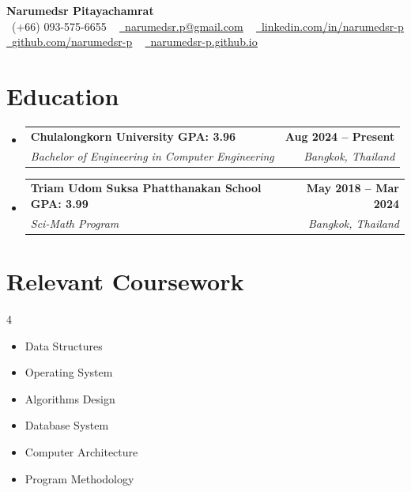 \documentclass[letterpaper,11pt]{article}
\makeatletter
\newcommand{\resumeSubheading}[4]{
  \vspace{-2pt}\item
    \begin{tabular*}{1.0\textwidth}[t]{l@{\extracolsep{\fill}}r}
      \textbf{#1} & \textbf{\small #2} \\
      \textit{\small#3} & \textit{\small #4} \\
    \end{tabular*}\vspace{-7pt}
}
\newcommand{\resumeSubHeadingListStart}{\begin{itemize}[leftmargin=0.0in, label={}]}
\newcommand{\resumeSubHeadingListEnd}{\end{itemize}}
\makeatother
\begin{document}

\begin{center}
    \textbf{\Huge Narumedsr Pitayachamrat} \\ \vspace{2pt}
    \small 
    \raisebox{-0.1\height}\faPhone\ (+66) 093-575-6655 ~ 
    \href{mailto:narumedsr.p@gmail.com}{\raisebox{-0.2\height}\faEnvelope\ \underline{narumedsr.p@gmail.com}} ~ 
    \href{https://linkedin.com/in/narumedsr-p}{\raisebox{-0.2\height}\faLinkedin\ \underline{linkedin.com/in/narumedsr-p}} \\ \vspace{3pt}
    \href{https://github.com/narumedsr-p}{\raisebox{-0.2\height}\faGithub\ \underline{github.com/narumedsr-p}} ~
    \href{https://narumedsr-p.github.io/}{\raisebox{-0.2\height}\faGlobe\ \underline{narumedsr-p.github.io}}
    \vspace{-8pt}
\end{center}


\section{Education}
  \resumeSubHeadingListStart
    \resumeSubheading
      {Chulalongkorn University GPA: 3.96}{Aug 2024 -- Present}
      {Bachelor of Engineering in Computer Engineering}{Bangkok, Thailand}
    \resumeSubheading
      {Triam Udom Suksa Phatthanakan School GPA: 3.99}{May 2018 -- Mar 2024}
      {Sci-Math Program}{Bangkok, Thailand}
  \resumeSubHeadingListEnd

\section{Relevant Coursework}
        \begin{multicols}{4}
            \begin{itemize}[itemsep=-5pt, parsep=3pt]
                \item\small Data Structures
                \item Operating System
                \item Algorithms Design
                \item Database System
                \item Computer Architecture
                \item Program Methodology
            \end{itemize}
        \end{multicols}
        \vspace*{2.0\multicolsep}
\end{document}
